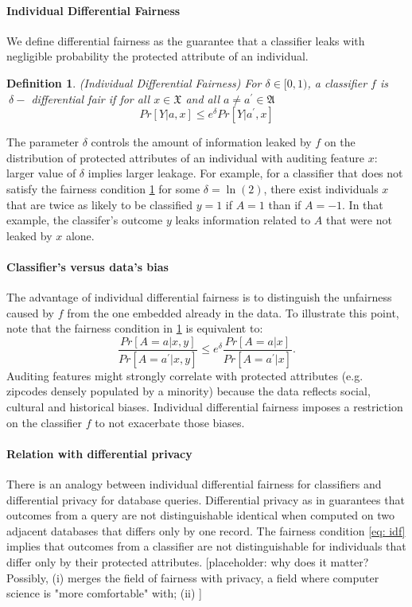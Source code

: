 \documentclass{article}
\newtheorem{defn}{Definition}[section]
\begin{document}
\paragraph{Individual Differential Fairness} 
We define differential fairness as the guarantee that a classifier leaks with negligible probability the protected attribute of an individual.

\begin{defn}(Individual Differential Fairness)
\label{def: idf}
For $\delta \in [0, 1)$, a classifier $f$ is $\ \delta-$ differential fair if for all $x\in\mathfrak{X}$ and all $a\neq a^{'}\in \mathfrak{A}$
\begin{equation}
\label{eq: idf}
    Pr[Y|a, x] \leq e^{\delta}Pr[Y|a^{'}, x]
\end{equation}
\end{defn}

The parameter $\delta$ controls the amount of information leaked by $f$ on the distribution of protected attributes of an individual with auditing feature $x$: larger value of $\delta$ implies larger leakage. For example, for a classifier that does not satisfy the fairness condition \ref{def: idf} for some $\delta=\ln(2)$, there exist individuals $x$ that are twice as likely to be classified $y=1$ if $A=1$ than if $A=-1$. In that example, the classifer's outcome $y$ leaks information related to $A$ that were not leaked by $x$ alone.   

\paragraph{Classifier's versus data's bias}
The advantage of individual differential fairness is to distinguish the unfairness caused by $f$  from the one embedded already in the data. To illustrate this point, note that the fairness condition in \ref{def: idf} is equivalent to:
\begin{equation}
    \frac{Pr[A=a|x, y]}{Pr[A=a^{'}|x, y]} \leq e^{\delta}\frac{Pr[A=a|x]}{Pr[A=a^{'}|x]}.
\end{equation}
Auditing features might strongly correlate with protected attributes (e.g. zipcodes densely populated by a minority) because the data reflects social, cultural and historical biases. Individual differential fairness imposes a restriction on the classifier $f$ to not exacerbate those biases.  

\paragraph{Relation with differential privacy}
There is an analogy between individual differential fairness for classifiers and differential privacy for database queries. Differential privacy as in  \cite{dwork2014algorithmic} guarantees that outcomes from a query are not distinguishable identical when computed on two adjacent databases that differs only by one record. The fairness condition \eqref{eq: idf} implies that outcomes from a classifier are not distinguishable for individuals that differ only by their protected attributes. [placeholder: why does it matter? Possibly, (i) merges the field of fairness with privacy, a field where computer science is "more comfortable" with; (ii) ] 
\end{document}
